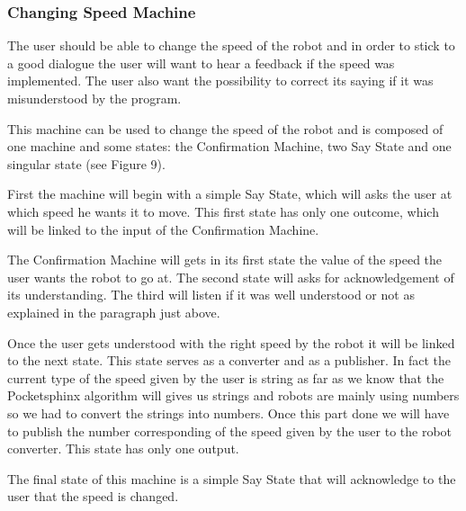 \subsubsection{Changing Speed Machine}
The user should be able to change the speed of the robot and in order to stick to a good dialogue the user will want to hear a feedback if the speed was implemented. The user also want the possibility to correct its saying if it was misunderstood by the program.

This machine can be used to change the speed of the robot and is composed of one machine and some states: the Confirmation Machine, two Say State and one singular state (see Figure 9). 

First the machine will begin with a simple Say State, which will asks the user at which speed he wants it to move. This first state has only one outcome, which will be linked to the input of the Confirmation Machine.

The Confirmation Machine will gets in its first state the value of the speed the user wants the robot to go at. The second state will asks for acknowledgement of its understanding. The third will listen if it was well understood or not as explained in the paragraph just above. 

Once the user gets understood with the right speed by the robot it will be linked to the next state. This state serves as a converter and as a publisher. In fact the current type of the speed given by the user is string as far as we know that the Pocketsphinx algorithm will gives us strings and robots are mainly using numbers so we had to convert the strings into numbers. Once this part done we will have to publish the number corresponding of the speed given by the user to the robot converter. This state has only one output.

The final state of this machine is a simple Say State that will acknowledge to the user that the speed is changed.

